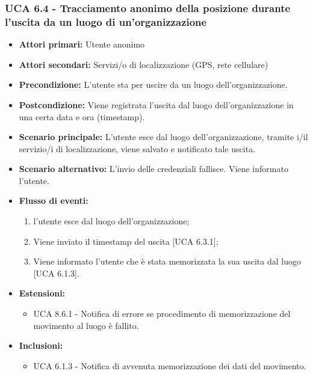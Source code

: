 \subsubsection{UCA 6.4 - Tracciamento anonimo della posizione durante l'uscita da un luogo di un'organizzazione}
\begin{itemize}
	\item \textbf{Attori primari:} Utente anonimo
	\item \textbf{Attori secondari:} Servizi/o di localizzazione (GPS, rete cellulare)
	\item \textbf{Precondizione:} L'utente sta per uscire da un luogo dell'organizzazione.
	\item \textbf{Postcondizione:} Viene registrata l'uscita dal luogo dell'organizzazione in una certa data e ora (timestamp).
	\item \textbf{Scenario principale:} L'utente esce dal luogo dell'organizzazione, tramite i/il servizio/i di localizzazione, viene salvato e notificato tale uscita. 
	\item \textbf{Scenario alternativo:} L'invio delle credenziali fallisce. Viene informato l'utente.
	\item \textbf{Flusso di eventi:}
	\begin{enumerate}
		\item l'utente esce dal luogo dell'organizzazione;
		\item Viene inviato il timestamp del uscita [UCA 6.3.1];
		\item Viene informato l'utente che è stata memorizzata la sua uscita dal luogo [UCA 6.1.3].
	\end{enumerate}
	\item \textbf{Estensioni:}
	\begin{itemize}
		\item UCA 8.6.1 - Notifica di errore se procedimento di memorizzazione del movimento al luogo è fallito.
	\end{itemize}
	\item \textbf{Inclusioni:}
	\begin{itemize}
		\item UCA 6.1.3 - Notifica di avvenuta memorizzazione dei dati del movimento.
	\end{itemize}
\end{itemize}